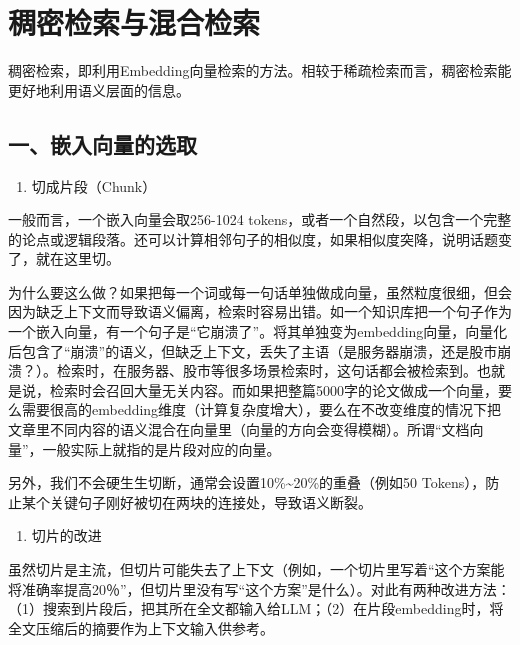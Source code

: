 \clearpage

\hypertarget{ux7a20ux5bc6ux68c0ux7d22ux4e0eux6df7ux5408ux68c0ux7d22}{%
\section{稠密检索与混合检索}\label{ux7a20ux5bc6ux68c0ux7d22ux4e0eux6df7ux5408ux68c0ux7d22}}

稠密检索，即利用Embedding向量检索的方法。相较于稀疏检索而言，稠密检索能更好地利用语义层面的信息。

\hypertarget{ux4e00ux5d4cux5165ux5411ux91cfux7684ux9009ux53d6}{%
\subsection{一、嵌入向量的选取}\label{ux4e00ux5d4cux5165ux5411ux91cfux7684ux9009ux53d6}}

\begin{enumerate}
\def\labelenumi{\arabic{enumi}.}
\tightlist
\item
  切成片段（Chunk）
\end{enumerate}

一般而言，一个嵌入向量会取256-1024 tokens，或者一个自然段，以包含一个完整的论点或逻辑段落。还可以计算相邻句子的相似度，如果相似度突降，说明话题变了，就在这里切。

为什么要这么做？如果把每一个词或每一句话单独做成向量，虽然粒度很细，但会因为缺乏上下文而导致语义偏离，检索时容易出错。如一个知识库把一个句子作为一个嵌入向量，有一个句子是``它崩溃了''。将其单独变为embedding向量，向量化后包含了``崩溃''的语义，但缺乏上下文，丢失了主语（是服务器崩溃，还是股市崩溃？）。检索时，在服务器、股市等很多场景检索时，这句话都会被检索到。也就是说，检索时会召回大量无关内容。而如果把整篇5000字的论文做成一个向量，要么需要很高的embedding维度（计算复杂度增大），要么在不改变维度的情况下把文章里不同内容的语义混合在向量里（向量的方向会变得模糊）。所谓``文档向量''，一般实际上就指的是片段对应的向量。

另外，我们不会硬生生切断，通常会设置10\%\textasciitilde20\%的重叠（例如50 Tokens），防止某个关键句子刚好被切在两块的连接处，导致语义断裂。

\begin{enumerate}
\def\labelenumi{\arabic{enumi}.}
\setcounter{enumi}{1}
\tightlist
\item
  切片的改进
\end{enumerate}

虽然切片是主流，但切片可能失去了上下文（例如，一个切片里写着``这个方案能将准确率提高20％''，但切片里没有写``这个方案''是什么）。对此有两种改进方法：（1）搜索到片段后，把其所在全文都输入给LLM；（2）在片段embedding时，将全文压缩后的摘要作为上下文输入供参考。

